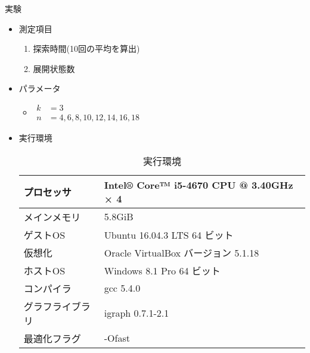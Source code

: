 \begin{frame}{実験}
  \begin{itemize}
  \item 測定項目
    \begin{enumerate}
    \item 探索時間(10回の平均を算出)
    \item 展開状態数
    \end{enumerate}
  \item パラメータ
    \begin{itemize}
    \item[]\par$\begin{aligned}
      k &= 3 \\
      n &= 4,6,8,10,12,14,16,18
    \end{aligned}$
    \end{itemize}
  \item 実行環境
    \par\begin{table}
    \scriptsize
    \caption{実行環境}
    \label{tab:env-lab}
    \centering
    \begin{tabular}{ll}
      \hline
      プロセッサ & Intel® Core™ i5-4670 CPU @ 3.40GHz × 4 \\ \hline
      メインメモリ & 5.8GiB \\ \hline
      ゲストOS & Ubuntu 16.04.3 LTS 64 ビット \\ \hline
      仮想化 & Oracle VirtualBox バージョン 5.1.18 \\ \hline
      ホストOS & Windows 8.1 Pro 64 ビット \\ \hline
      コンパイラ & gcc 5.4.0 \\ \hline
      グラフライブラリ & igraph 0.7.1-2.1 \\ \hline
      最適化フラグ & -Ofast \\ \hline
    \end{tabular}
    \end{table}
  \end{itemize}
\end{frame}


